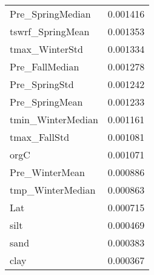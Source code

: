\begin{tabular}{lr}
Pre_SpringMedian & 0.001416 \\
tswrf_SpringMean & 0.001353 \\
tmax_WinterStd & 0.001334 \\
Pre_FallMedian & 0.001278 \\
Pre_SpringStd & 0.001242 \\
Pre_SpringMean & 0.001233 \\
tmin_WinterMedian & 0.001161 \\
tmax_FallStd & 0.001081 \\
orgC & 0.001071 \\
Pre_WinterMean & 0.000886 \\
tmp_WinterMedian & 0.000863 \\
Lat & 0.000715 \\
silt & 0.000469 \\
sand & 0.000383 \\
clay & 0.000367 \\
\bottomrule
\end{tabular}
